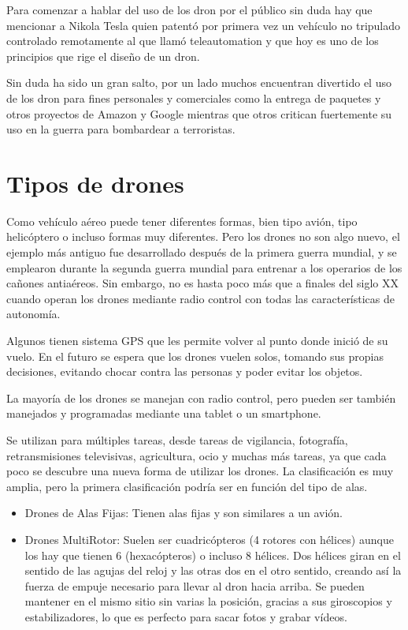 Para comenzar a hablar del uso de los dron por el público sin duda hay que mencionar a Nikola Tesla quien patentó por primera vez un vehículo no tripulado controlado remotamente al que llamó teleautomation y que hoy es uno de los principios que rige el diseño de un dron.    

Sin duda ha sido un gran salto, por un lado muchos encuentran divertido el uso de los dron para fines personales y comerciales como la entrega de paquetes y otros proyectos de Amazon y Google mientras que otros critican fuertemente su uso en la guerra para bombardear a terroristas.

\section{Tipos de drones}
\label{sec:tiposdrones}

Como vehículo aéreo puede tener diferentes formas, bien tipo avión, tipo helicóptero o incluso formas muy diferentes. Pero los drones no son algo nuevo, el ejemplo más antiguo fue desarrollado después de la primera guerra mundial, y se emplearon durante la segunda guerra mundial para entrenar a los operarios de los cañones antiaéreos. Sin embargo, no es hasta poco más que a finales del siglo XX cuando operan los drones mediante radio control con todas las características de autonomía.

Algunos tienen sistema GPS que les permite volver al punto donde inició de su vuelo. En el futuro se espera que los drones vuelen solos, tomando sus propias decisiones, evitando chocar contra las personas y poder evitar los objetos.

La mayoría de los drones se manejan con radio control, pero pueden ser también manejados y programadas mediante una tablet o un smartphone.

Se utilizan para múltiples tareas, desde tareas de vigilancia, fotografía, retransmisiones televisivas, agricultura, ocio y muchas más tareas, ya que cada poco se descubre una nueva forma de utilizar los drones.
La clasificación es muy amplia, pero la primera clasificación podría ser en función del tipo de alas.

\begin{itemize}
\item Drones de Alas Fijas: Tienen alas fijas y son similares a un avión.
\item Drones MultiRotor: Suelen ser cuadricópteros (4 rotores con hélices) aunque los hay que tienen 6 (hexacópteros) o incluso 8 hélices. Dos hélices giran en el sentido de las agujas del reloj y las otras dos en el otro sentido, creando así la fuerza de empuje necesario para llevar al dron hacia arriba. Se pueden mantener en el mismo sitio sin varias la posición, gracias a sus giroscopios y estabilizadores, lo que es perfecto para sacar fotos y grabar vídeos.
\end{itemize}

